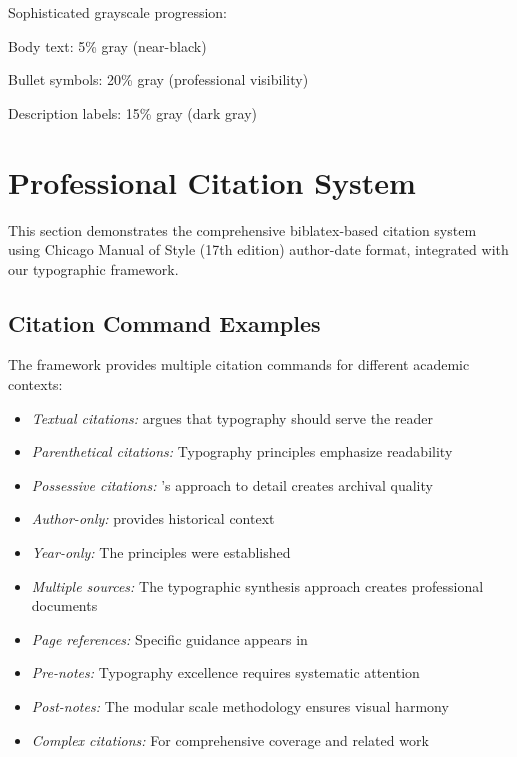 \documentclass[11pt]{article}
\begin{document}
 Sophisticated grayscale progression:
\begin{compactitem}
\item Body text: 5\% gray (near-black)
\item Bullet symbols: 20\% gray (professional visibility)
\item Description labels: 15\% gray (dark gray)
\end{compactitem}

\clearpage

\section{Professional Citation System}

This section demonstrates the comprehensive biblatex-based citation system using Chicago Manual of Style (17th edition) author-date format, integrated with our typographic framework.

\subsection{Citation Command Examples}

The framework provides multiple citation commands for different academic contexts:

\begin{itemize}
\item \emph{Textual citations:} \textcite{butterick2019practical} argues that typography should serve the reader
\item \emph{Parenthetical citations:} Typography principles emphasize readability \parencite{brown2018flexible}
\item \emph{Possessive citations:} \citeauthor{hochuli1987detail}'s approach to detail creates archival quality
\item \emph{Author-only:} \textcite{bringhurst2012elements} provides historical context
\item \emph{Year-only:} The principles were established \parencite*{hochuli1987detail}
\end{itemize}

\begin{itemize}
\item \emph{Multiple sources:} The typographic synthesis approach \parencite{butterick2019practical,brown2018flexible,hochuli1987detail} creates professional documents
\item \emph{Page references:} Specific guidance appears in \textcite{butterick2019practical}
\item \emph{Pre-notes:} Typography excellence requires systematic attention \parencite{hochuli1987detail}
\item \emph{Post-notes:} The modular scale methodology \parencite{brown2018flexible} ensures visual harmony
\item \emph{Complex citations:} For comprehensive coverage \parencite{butterick2019practical} and related work \parencite{bringhurst2012elements}
\end{itemize}
\end{document}
